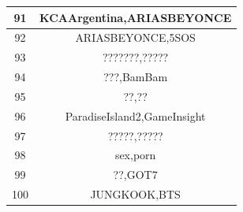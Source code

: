 \documentclass[11pt,a4paper,oneside]{article}
\begin{document}
\begin{center}
\begin{tabular}{|c|c|}
	    	\hline
	    	91 & KCAArgentina,ARIASBEYONCE \\ 
	    	\hline
	    	92 & ARIASBEYONCE,5SOS \\ 
	    	\hline
	    	93 & ???????,????? \\ 
	    	\hline
	    	94 & ???,BamBam \\ 
	    	\hline
	    	95 & ??,?? \\ 
	    	\hline
	    	96 & ParadiseIsland2,GameInsight \\ 
	    	\hline
	    	97 & ?????,????? \\ 
	    	\hline
	    	98 & sex,porn \\ 
	    	\hline
	    	99 & ??,GOT7 \\ 
	    	\hline
	    	100 & JUNGKOOK,BTS \\ 
	    	\hline
	    \end{tabular}
    \end{center}
    
    
\end{document}
